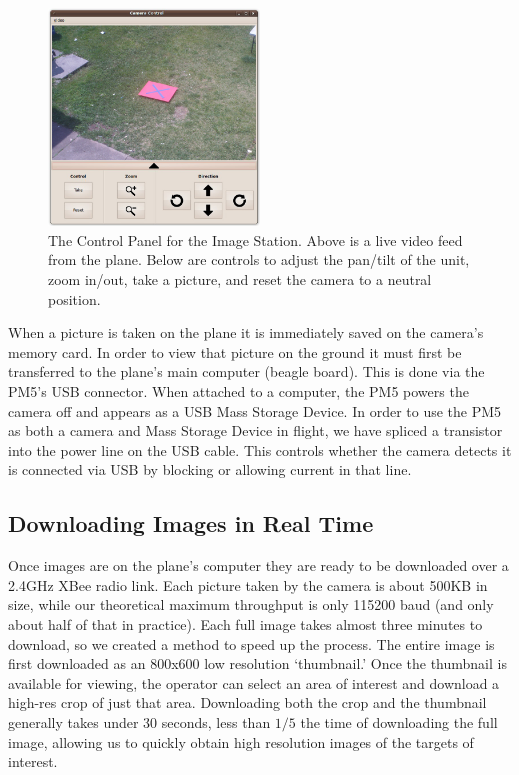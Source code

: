 \documentclass[pdftex,10pt,letter]{article}
\begin{document}
\begin{figure}
  \centering
  	\includegraphics[width=0.5\textwidth]{../images/ImageStationControls.jpg}
  	\caption[Image Station Control Panel]{The Control Panel for the Image Station.  Above is a live video feed from the plane.  Below are controls to adjust the pan/tilt of the unit, zoom in/out, take a picture, and reset the camera to a neutral position.}
  	\label{fig:imagestationcontrols}
\end{figure}

When a picture is taken on the plane it is immediately saved on the camera's memory card.  In order to view that picture on the ground it must first be transferred to the plane's main computer (beagle board).  This is done via the PM5's USB connector.  When attached to a computer, the PM5 powers the camera off and appears as a USB Mass Storage Device. In order to use the PM5 as both a camera and Mass Storage Device in flight, we have spliced a transistor into the power line on the USB cable. This controls whether the camera detects it is connected via USB by blocking or allowing current in that line.

\subsection{Downloading Images in Real Time}

Once images are on the plane's computer they are ready to be downloaded over a 2.4GHz XBee radio link.  Each picture taken by the camera is about 500KB in size, while our theoretical maximum throughput is only 115200 baud (and only about half of that in practice).  Each full image takes almost three minutes to download, so we created a method to speed up the process.  The entire image is first downloaded as an 800x600 low resolution `thumbnail.'  Once the thumbnail is available for viewing, the operator can select an area of interest and download a high-res crop of just that area.  Downloading both the crop and the thumbnail generally takes under 30 seconds, less than $1/5$ the time of downloading the full image, allowing us to quickly obtain high resolution images of the targets of interest.
\end{document}
